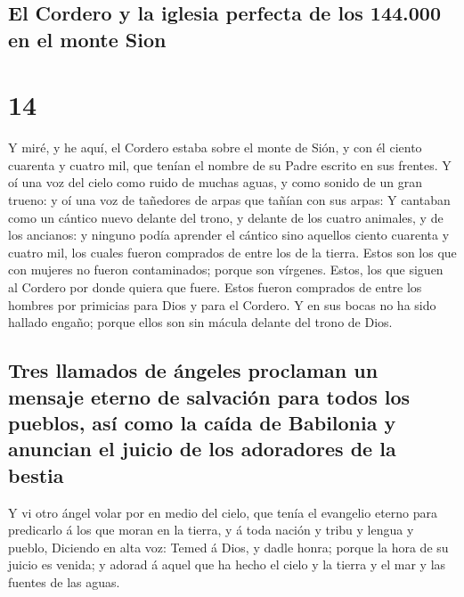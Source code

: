 \hypertarget{el-cordero-y-la-iglesia-perfecta-de-los-144.000-en-el-monte-sion}{%
\subsection{El Cordero y la iglesia perfecta de los 144.000 en el monte
Sion}\label{el-cordero-y-la-iglesia-perfecta-de-los-144.000-en-el-monte-sion}}

\hypertarget{section-66-14}{%
\section{14}\label{section-66-14}}

 Y miré, y he aquí, el Cordero estaba sobre el monte de
Sión, y con él ciento cuarenta y cuatro mil, que tenían el nombre de su
Padre escrito en sus frentes.  Y oí una voz del cielo como
ruido de muchas aguas, y como sonido de un gran trueno: y oí una voz de
tañedores de arpas que tañían con sus arpas:  Y cantaban
como un cántico nuevo delante del trono, y delante de los cuatro
animales, y de los ancianos: y ninguno podía aprender el cántico sino
aquellos ciento cuarenta y cuatro mil, los cuales fueron comprados de
entre los de la tierra.  Estos son los que con mujeres no
fueron contaminados; porque son vírgenes. Estos, los que siguen al
Cordero por donde quiera que fuere. Estos fueron comprados de entre los
hombres por primicias para Dios y para el Cordero.  Y en
sus bocas no ha sido hallado engaño; porque ellos son sin mácula delante
del trono de Dios.

\hypertarget{tres-llamados-de-uxe1ngeles-proclaman-un-mensaje-eterno-de-salvaciuxf3n-para-todos-los-pueblos-asuxed-como-la-cauxedda-de-babilonia-y-anuncian-el-juicio-de-los-adoradores-de-la-bestia}{%
\subsection{Tres llamados de ángeles proclaman un mensaje eterno de
salvación para todos los pueblos, así como la caída de Babilonia y
anuncian el juicio de los adoradores de la
bestia}\label{tres-llamados-de-uxe1ngeles-proclaman-un-mensaje-eterno-de-salvaciuxf3n-para-todos-los-pueblos-asuxed-como-la-cauxedda-de-babilonia-y-anuncian-el-juicio-de-los-adoradores-de-la-bestia}}

 Y vi otro ángel volar por en medio del cielo, que tenía
el evangelio eterno para predicarlo á los que moran en la tierra, y á
toda nación y tribu y lengua y pueblo,  Diciendo en alta
voz: Temed á Dios, y dadle honra; porque la hora de su juicio es venida;
y adorad á aquel que ha hecho el cielo y la tierra y el mar y las
fuentes de las aguas.

